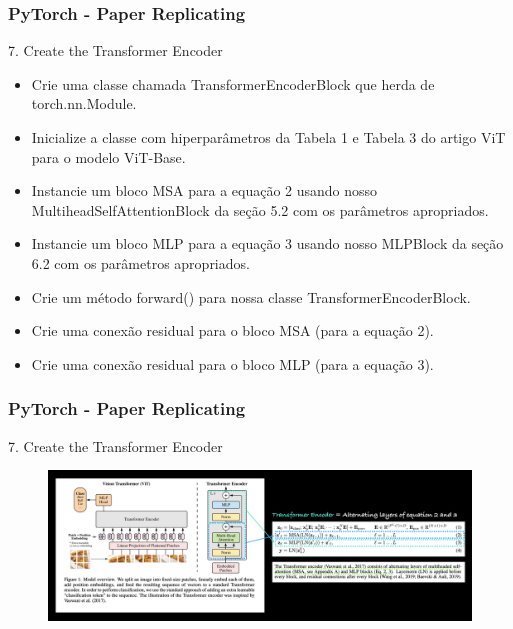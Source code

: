 \documentclass{beamer}
\begin{document}
\begin{frame}
	\frametitle{PyTorch - Paper Replicating}
	\begin{block}{7. Create the Transformer Encoder}
	\begin{itemize}
			\item Crie uma classe chamada TransformerEncoderBlock que herda de torch.nn.Module.
			\item Inicialize a classe com hiperparâmetros da Tabela 1 e Tabela 3 do artigo ViT para o modelo ViT-Base.
			\item Instancie um bloco MSA para a equação 2 usando nosso MultiheadSelfAttentionBlock da seção 5.2 com os parâmetros apropriados.
			\item Instancie um bloco MLP para a equação 3 usando nosso MLPBlock da seção 6.2 com os parâmetros apropriados.
			\item Crie um método forward() para nossa classe TransformerEncoderBlock.
			\item Crie uma conexão residual para o bloco MSA (para a equação 2).
			\item Crie uma conexão residual para o bloco MLP (para a equação 3).
		\end{itemize}
		
	\end{block}
\end{frame}
\begin{frame}
	\frametitle{PyTorch - Paper Replicating}
	\begin{block}{7. Create the Transformer Encoder}
		\begin{figure}
			\centering
			\includegraphics[width=1\linewidth]{figures/mlp1}
		\end{figure}
		
		
	\end{block}
\end{frame}
\end{document}
